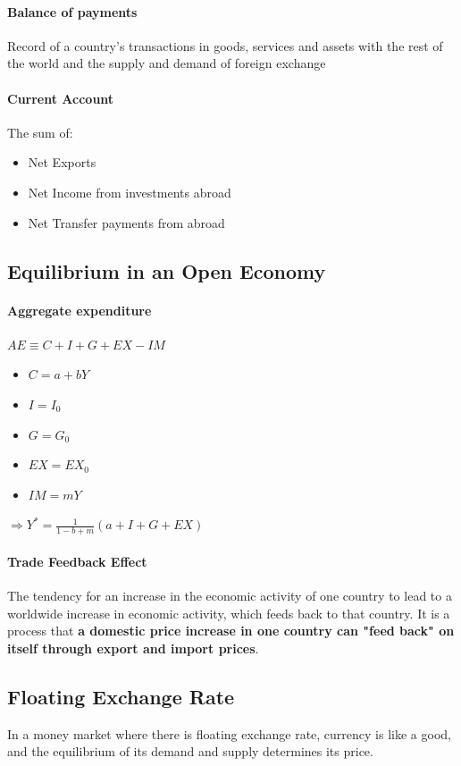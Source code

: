 \documentclass[11pt]{article}
\begin{document}
\paragraph{Balance of payments}
Record of a country's transactions in goods, services and assets with the rest of the world and the supply and demand of foreign exchange
\paragraph{Current Account} The sum of:
\begin{itemize}
    \item Net Exports
    \item Net Income from investments abroad
    \item Net Transfer payments from abroad
\end{itemize}
\subsection{Equilibrium in an Open Economy}
\paragraph{Aggregate expenditure}
$AE \equiv C + I + G + EX - IM$
\begin{itemize}
    \item $C = a + bY$
    \item $I = I_0$
    \item $G = G_0$
    \item $EX = EX_0$
    \item $IM = mY$ 
\end{itemize}
$\Rightarrow Y^* = \frac{1}{1-b+m}(a+I+G+EX)$
\paragraph{Trade Feedback Effect}
The tendency for an increase in the economic activity of one country to lead to a worldwide increase in economic activity, which feeds back to that country. It is a process that \textbf{a domestic price increase in one country can "feed back" on itself through export and import prices}.

\subsection{Floating Exchange Rate}
In a money market where there is floating exchange rate, currency is like a good, and the equilibrium of its demand and supply determines its price.
\end{document}
